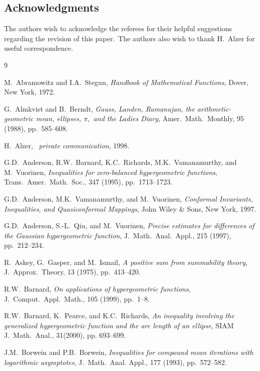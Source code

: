 \documentclass[final,oneeqnum]{siamltex}
\begin{document}
\subsection*{Acknowledgments}
\noindent
 The authors wish to acknowledge
 the referees for
 their helpful suggestions regarding the revision of
this paper.\ The authors also wish to thank H.\ Alzer for useful correspondence.

\begin{thebibliography}{9}

  {\sc M.\ Abramowitz and I.A.\ Stegun}, {\em Handbook of Mathematical
Functions},  Dover, New York, 1972.

  {\sc G.\ Almkvist and B.\ Berndt}, {\em Gauss, Landen, Ramanujan, the
arithmetic-geometric mean, ellipses, $\pi,$ and the
Ladies Diary},  Amer.\ Math.\ Monthly, 95 (1988), pp.\ 585--608.

 {\sc H.\ Alzer},~%
{\it private communication}, 1998.

 {\sc G.D.\ Anderson, R.W.\ Barnard, K.C.\ Richards, M.K.\ Vamanamurthy,
and M.\ Vuorinen}, {\em Inequalities for zero-balanced hypergeometric functions},
Trans.\ Amer.\ Math.\ Soc., 347 (1995), pp.\ 1713--1723.

 {\sc G.D.\ Anderson, M.K.\ Vamanamurthy, and M.\ Vuorinen}, 
{\em Conformal Invariants, Inequalities, and Quasiconformal Mappings},
 John Wiley \& Sons, New York, 1997.

 {\sc G.D.\ Anderson, S.-L.\ Qiu, and M.\ Vuorinen}, {\em Precise estimates
for differences of the Gaussian hypergeometric function},
J.\ Math.\ Anal.\ Appl., 215 (1997), pp.\ 212--234.

  {\sc R.\ Askey,  G.\ Gasper, and M.\ Ismail}, {\em A positive sum from
summability theory},  J.\  Approx.\ Theory, 13
(1975), pp.\ 413--420.

 {\sc R.W.\ Barnard},
{\em On applications of hypergeometric functions}, J.\ Comput.\ Appl.\ Math.,
105 (1999), pp.\ 1--8.

 {\sc R.W.\ Barnard, K.\ Pearce, and K.C.\ Richards}, {\em An inequality
involving the generalized hypergeometric function and the arc length of an
ellipse},
SIAM J.\ Math.\ Anal., 31(2000), pp. 693--699.

 {\sc J.M.\ Borwein and P.B.\ Borwein}, {\em Inequalities
 for compound mean iterations with logarithmic asymptotes}, J.\ Math.\ Anal.
Appl.,
177 (1993), pp.\ 572--582.


\end{thebibliography}
\end{document}
